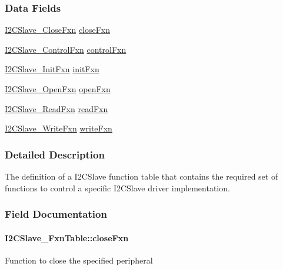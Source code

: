 \subsubsection*{Data Fields}
\begin{DoxyCompactItemize}
\item 
\hyperlink{_i2_c_slave_8h_a9a2e6a8574316d6a494d208de4329fc7}{I2\+C\+Slave\+\_\+\+Close\+Fxn} \hyperlink{struct_i2_c_slave___fxn_table_a7c9cf5a9299386f5b615e66e996aeb26}{close\+Fxn}
\item 
\hyperlink{_i2_c_slave_8h_a895a9a94cd98b391cdd3d54ef62dd86a}{I2\+C\+Slave\+\_\+\+Control\+Fxn} \hyperlink{struct_i2_c_slave___fxn_table_a5d9e1649f54e3ac467254e1812ae37f4}{control\+Fxn}
\item 
\hyperlink{_i2_c_slave_8h_ae821c2b97cf6640cd58b8e0c40efb464}{I2\+C\+Slave\+\_\+\+Init\+Fxn} \hyperlink{struct_i2_c_slave___fxn_table_aa33c7271b7f99e9b1c1391f9181b010d}{init\+Fxn}
\item 
\hyperlink{_i2_c_slave_8h_a7c6638bde6397024b1f1ece4f9baed37}{I2\+C\+Slave\+\_\+\+Open\+Fxn} \hyperlink{struct_i2_c_slave___fxn_table_ae9eabd5257e4c7c69454ca932f0aeaa8}{open\+Fxn}
\item 
\hyperlink{_i2_c_slave_8h_ac74d6f05afaf02a4238fe59a588cd787}{I2\+C\+Slave\+\_\+\+Read\+Fxn} \hyperlink{struct_i2_c_slave___fxn_table_a010cac9104f7fd8204737253873d7438}{read\+Fxn}
\item 
\hyperlink{_i2_c_slave_8h_a7515207a9b0bde39ff2744ac3ed366ea}{I2\+C\+Slave\+\_\+\+Write\+Fxn} \hyperlink{struct_i2_c_slave___fxn_table_a3ffab7eeff49da96baac7a496f06a269}{write\+Fxn}
\end{DoxyCompactItemize}


\subsubsection{Detailed Description}
The definition of a I2\+C\+Slave function table that contains the required set of functions to control a specific I2\+C\+Slave driver implementation. 

\subsubsection{Field Documentation}
\paragraph[{close\+Fxn}]{ I2\+C\+Slave\+\_\+\+Fxn\+Table\+::close\+Fxn}\label{struct_i2_c_slave___fxn_table_a7c9cf5a9299386f5b615e66e996aeb26}
Function to close the specified peripheral 
